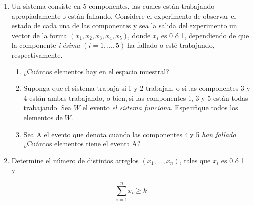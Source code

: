 \documentclass[a4paper]{article}
\begin{document}
\begin{enumerate}
\item Un sistema consiste en 5 componentes, las cuales están trabajando apropiadamente o están fallando. Considere el experimento de observar el estado de cada una de las componentes y sea la salida del experimento un vector de la forma $(x_1,x_2,x_3,x_4,x_5)$, donde $x_i$ es 0 ó 1, dependiendo de que la componente \textit{i-ésima} $(i = 1, . . . , 5)$ ha fallado o esté trabajando, respectivamente.
\begin{enumerate}
    \item ¿Cuántos elementos hay en el espacio muestral?
    \item Suponga que el sistema trabaja si 1 y 2 trabajan, o si las componentes 3 y 4 están ambas trabajando, o bien, si las componentes 1, 3 y 5 están todas trabajando. Sea $W$ el evento \textit{el sistema funciona}. Especifique todos los elementos de $W$.
    \item Sea A el evento que denota cuando las componentes 4 y 5 \textit{han fallado} ¿Cuántos elementos tiene el evento A?
\end{enumerate}

\item Determine el número de distintos arreglos $(x_1, . . . , x_n)$, tales que $x_i$ es 0 ó 1 y

$$ \sum_{i=1}^{n} x_i \ge k $$
\end{enumerate}
\end{document}
